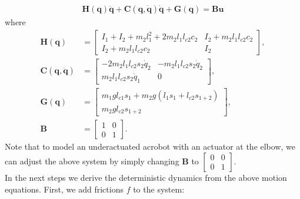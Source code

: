\begin{align} \label{eq:manipulator}
\mathbf{H}(\mathbf q) \mathbf{\ddot{q}} +  \mathbf {C( q,\dot{ q})}\mathbf{\dot{q}} + {\mathbf G}(\mathbf q) = \mathbf {Bu} 
\end{align}
where
\begin{align}
{\mathbf H}(\mathbf q) &= \begin{bmatrix} I_1 + I_2 + m_2 l_1^2 + 2m_2 l_1 l_{c2}
  c_2 & I_2 + m_2 l_1 l_{c2} c_2 \\ I_2 + m_2 l_1 l_{c2} c_2 & I_2
  \end{bmatrix},\label{eq:Hacrobot} \nonumber \\
  \mathbf {C(q,\dot{q})} &= \begin{bmatrix} -2 m_2
  l_1 l_{c2} s_2 \dot{q}_2 & -m_2 l_1 l_{c2} s_2 \dot{q}_2 \\ m_2 l_1
  l_{c2} s_2 \dot{q}_1 & 0 \end{bmatrix}, \nonumber \\
{\mathbf G}(\mathbf q) &= \begin{bmatrix} m_1 g l_{c1}s_1 + m_2 g (l_1 s_1 + l_{c2}s_{1+2})
\\ m_2 g l_{c2} s_{1+2} \end{bmatrix}, \nonumber\\
  {\mathbf B} &= \begin{bmatrix} 1 & 0 \\ 0 & 1 \end{bmatrix}. \nonumber
\end{align}
 Note that to model an underactuated acrobot with an actuator at the elbow, we can adjust the above system by simply changing $\mathbf B$ to $\begin{bmatrix} 0 & 0 \\ 0 & 1 \end{bmatrix}$.\\
\null \quad In the next steps we derive the deterministic dynamics from the above motion equations. First, we add frictions $f$ to the system:

